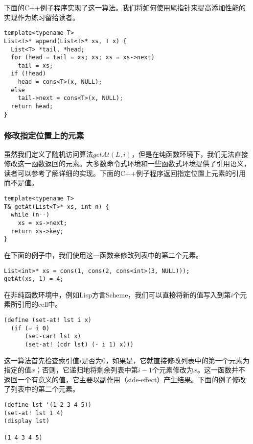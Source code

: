 \documentclass[UTF8]{article}
\begin{document}
下面的C++例子程序实现了这一算法。我们将如何使用尾指针来提高添加性能的实现作为练习留给读者。

\lstset{language=C++}
\begin{lstlisting}
template<typename T>
List<T>* append(List<T>* xs, T x) {
  List<T> *tail, *head;
  for (head = tail = xs; xs; xs = xs->next)
    tail = xs;
  if (!head)
    head = cons<T>(x, NULL);
  else
    tail->next = cons<T>(x, NULL);
  return head;
}
\end{lstlisting}

\subsubsection{修改指定位置上的元素}

虽然我们定义了随机访问算法$getAt(L, i)$，但是在纯函数环境下，我们无法直接修改这一函数返回的元素。大多数命令式环境和一些函数式环境提供了引用语义，读者可以参考\cite{mittype}了解详细的实现。下面的C++例子程序返回指定位置上元素的引用而不是值。

\lstset{language=C++}
\begin{lstlisting}
template<typename T>
T& getAt(List<T>* xs, int n) {
  while (n--)
    xs = xs->next;
  return xs->key;
}
\end{lstlisting}

在下面的例子中，我们使用这一函数来修改列表中的第二个元素。

\begin{lstlisting}
List<int>* xs = cons(1, cons(2, cons<int>(3, NULL)));
getAt(xs, 1) = 4;
\end{lstlisting}

在非纯函数环境中，例如Lisp方言Scheme，我们可以直接将新的值写入到第$i$个元素所引用的cell中。

\lstset{language=Lisp}
\begin{lstlisting}
(define (set-at! lst i x)
  (if (= i 0)
      (set-car! lst x)
      (set-at! (cdr lst) (- i 1) x)))
\end{lstlisting}

这一算法首先检查索引值$i$是否为0，如果是，它就直接修改列表中的第一个元素为指定的值$x$；否则，它递归地将剩余列表中第$i-1$个元素修改为$x$。这一函数并不返回一个有意义的值，它主要以副作用（side-effect）产生结果。下面的例子修改了列表中的第二个元素。

\begin{lstlisting}
(define lst '(1 2 3 4 5))
(set-at! lst 1 4)
(display lst)

(1 4 3 4 5)
\end{lstlisting}
\end{document}
